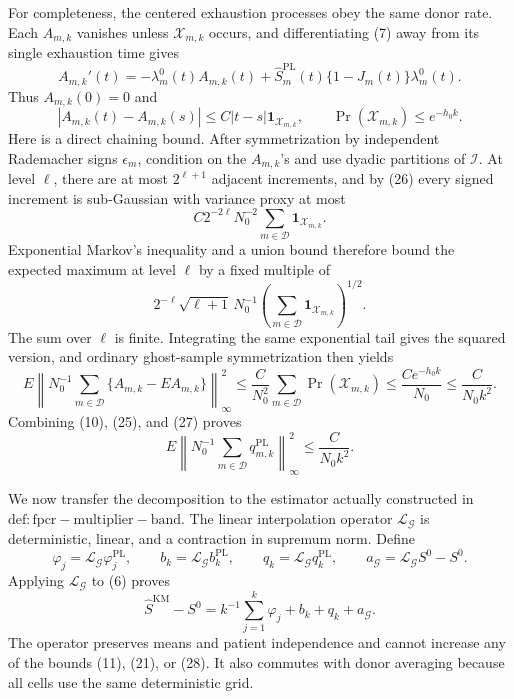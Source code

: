 For completeness, the centered exhaustion processes obey the same donor rate.  Each \(A_{m,k}\) vanishes unless \(\mathcal X_{m,k}\) occurs, and differentiating (7) away from its single exhaustion time gives
\[
 A_{m,k}'(t)=-\lambda_m^0(t)A_{m,k}(t)
 +\widehat S_m^{\mathrm{PL}}(t)\{1-J_m(t)\}\lambda_m^0(t).
\]
Thus \(A_{m,k}(0)=0\) and
\[
 |A_{m,k}(t)-A_{m,k}(s)|
 \le C|t-s|\mathbf 1_{\mathcal X_{m,k}},
 \qquad
 \Pr(\mathcal X_{m,k})\le e^{-h_0k}.                        \tag{26}
\]
Here is a direct chaining bound.  After symmetrization by independent Rademacher signs \(\epsilon_m\), condition on the \(A_{m,k}\)'s and use dyadic partitions of \(\mathcal I\).  At level \(\ell\), there are at most \(2^{\ell+1}\) adjacent increments, and by (26) every signed increment is sub-Gaussian with variance proxy at most
\[
 C2^{-2\ell}N_0^{-2}\sum_{m\in\mathcal D}
 \mathbf 1_{\mathcal X_{m,k}}.
\]
Exponential Markov's inequality and a union bound therefore bound the expected maximum at level \(\ell\) by a fixed multiple of
\[
 2^{-\ell}\sqrt{\ell+1}\,
 N_0^{-1}\left(\sum_{m\in\mathcal D}
 \mathbf 1_{\mathcal X_{m,k}}\right)^{1/2}.
\]
The sum over \(\ell\) is finite.  Integrating the same exponential tail gives the squared version, and ordinary ghost-sample symmetrization then yields
\[
 E\left\|N_0^{-1}\sum_{m\in\mathcal D}
 \{A_{m,k}-EA_{m,k}\}\right\|_\infty^2
 \le \frac{C}{N_0^2}\sum_{m\in\mathcal D}
 \Pr(\mathcal X_{m,k})
 \le \frac{Ce^{-h_0k}}{N_0}
 \le \frac{C}{N_0k^2}.                                      \tag{27}
\]
Combining (10), (25), and (27) proves
\[
 E\left\|N_0^{-1}\sum_{m\in\mathcal D}q_{m,k}^{\mathrm{PL}}
 \right\|_\infty^2
 \le \frac{C}{N_0k^2}.                                      \tag{28}
\]

We now transfer the decomposition to the estimator actually constructed in \(\mathrm{def:fpcr-multiplier-band}\).  The linear interpolation operator \(\mathcal L_{\mathcal G}\) is deterministic, linear, and a contraction in supremum norm.  Define
\[
 \varphi_j=\mathcal L_{\mathcal G}\varphi_j^{\mathrm{PL}},
 \qquad b_k=\mathcal L_{\mathcal G}b_k^{\mathrm{PL}},
 \qquad q_k=\mathcal L_{\mathcal G}q_k^{\mathrm{PL}},
 \qquad a_{\mathcal G}=\mathcal L_{\mathcal G}S^0-S^0.
\]
Applying \(\mathcal L_{\mathcal G}\) to (6) proves
\[
 \widehat S^{\mathrm{KM}}-S^0
 =k^{-1}\sum_{j=1}^k\varphi_j+b_k+q_k+a_{\mathcal G}.        \tag{29}
\]
The operator preserves means and patient independence and cannot increase any of the bounds (11), (21), or (28).  It also commutes with donor averaging because all cells use the same deterministic grid.

